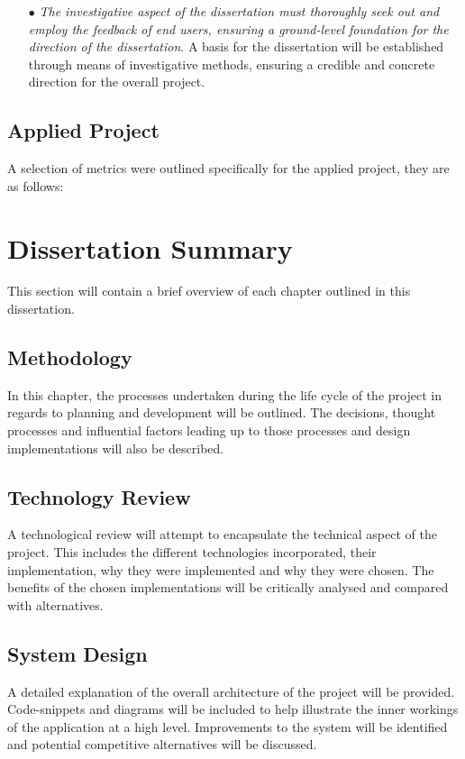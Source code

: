 \begin{itemize}
  \item[$\bullet$] \textit{The investigative aspect of the dissertation must thoroughly seek out and employ the feedback of end users, ensuring a ground-level foundation for the direction of the dissertation}. A basis for the dissertation will be established through means of investigative methods, ensuring a credible and concrete direction for the overall project. 
\end{itemize}

\subsection{Applied Project}
A selection of metrics were outlined specifically for the applied project, they are as follows: 

\section{Dissertation Summary}
This section will contain a brief overview of each chapter outlined in this dissertation.
\subsection{Methodology}
In this chapter, the processes undertaken during the life cycle of the project in regards to planning and development will be outlined. The decisions, thought processes and influential factors leading up to those processes and design implementations will also be described.
\subsection{Technology Review}
A technological review will attempt to encapsulate the technical aspect of the project. This includes the different technologies incorporated, their implementation, why they were implemented and why they were chosen. The benefits of the chosen implementations will be critically analysed and compared with alternatives.
\subsection{System Design}
A detailed explanation of the overall architecture of the project will be provided. Code-snippets and diagrams will be included to help illustrate the inner workings of the application at a high level. Improvements to the system will be identified and potential competitive alternatives will be discussed.
